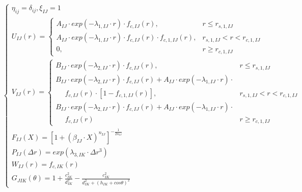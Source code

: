 \documentclass[12pt]{article}
\begin{document}
\begin{eqnarray*}
\left\{\begin{array}{l}
\eta_{ij}=\delta_{ij},\xi_{IJ}=1 \\
U_{IJ}\left(r\right)=\left\{\begin{array}{lr}
A_{IJ}\cdot exp\left(-\lambda_{1,IJ}\cdot r\right)\cdot f_{c,IJ}\left(r\right), & r\leq r_{s,1,IJ} \\
A_{IJ}\cdot exp\left(-\lambda_{1,IJ}\cdot r\right)\cdot f_{c,IJ}\left(r\right)\cdot f_{c,1,IJ}\left(r\right), & r_{s,1,IJ}<r<r_{c,1,IJ} \\
0, & r\ge r_{c,1,IJ}
\end{array}\right. \\
V_{IJ}\left(r\right)=\left\{\begin{array}{lr}
B_{IJ} \cdot exp\left(-\lambda_{2,IJ}\cdot r\right)\cdot f_{c,IJ}\left(r\right), & r\le r_{s,1,IJ} \\
B_{IJ} \cdot exp\left(-\lambda_{2,IJ}\cdot r\right)\cdot f_{c,IJ}\left(r\right)+A_{IJ}\cdot exp\left(-\lambda_{1,IJ}\cdot r\right)\cdot & \\ ~~~~~~ f_{c,IJ}\left(r\right)\cdot \left[1-f_{c,1,IJ}\left(r\right)\right], & r_{s,1,IJ}<r<r_{c,1,IJ} \\
B_{IJ} \cdot exp\left(-\lambda_{2,IJ}\cdot r\right)\cdot f_{c,IJ}\left(r\right)+A_{IJ}\cdot exp\left(-\lambda_{1,IJ}\cdot r\right)\cdot & \\ ~~~~~~ f_{c,IJ}\left(r\right) & r \ge r_{c,1,IJ}
\end{array}\right. \\
F_{IJ}\left(X\right)=\left[1+\left(\beta_{IJ}\cdot X\right)^{n_{IJ}}\right]^{-\frac{1}{2n_{IJ}}} \\
P_{IJ}\left(\Delta r\right)=exp\left(\lambda_{3,IK}\cdot \Delta r^3\right) \\ 
W_{IJ}\left(r\right)=f_{c,IK}\left(r\right) \\
G_{JIK}\left(\theta\right)=1+\frac{c_{IK}^2}{d_{IK}^2}-\frac{c_{IK}^2}{d_{IK}^2+\left(h_{IK}+cos\theta\right)^2}
\end{array}\right.
\end{eqnarray*} 
\end{document}

